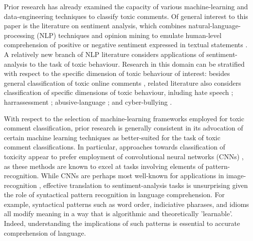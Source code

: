 
Prior research has already examined the capacity of various machine-learning and data-engineering techniques to classify toxic comments. 
Of general interest to this paper is the literature on sentiment analysis, which combines natural-language-processing (NLP) techniques and opinion mining to emulate human-level comprehension of positive or negative sentiment expressed in textual statements \cite{chowdhary2020natural, cambria2014jumping}.
A relatively new branch of NLP literature considers applications of sentiment-analysis to the task of toxic behaviour. 
Research in this domain can be stratified with respect to the specific dimension of toxic behaviour of interest: besides general classification of toxic online comments \cite{georgakopoulos2018convolutional,van2018challenges,risch2020toxic}, related literature also considers classification of specific dimensions of toxic behaviour, inluding hate speech \cite{mullah2021advances, ayo2020machine, rizos2019augment, yang2019exploring}; harrassessment \cite{abarna2022identification, basu2021cyberpolice, marwa2018deep}; abusive-language \cite{vidgen2020directions, nobata2016abusive, bourgonje2017automatic}; and cyber-bullying \cite{kanan2020cyber, akhter2019cyber, di2016unsupervised}.

With respect to the selection of machine-learning frameworks employed for toxic comment classification, prior research is generally consistent in its advocation of certain machine learning techniques as better-suited for the task of toxic comment classifications. In particular, approaches towards classification of toxicity appear to prefer employment of convolutional neural networks (CNNs) \cite{androcec2020machine}, as these methods are known to excel at tasks involving elements of pattern-recognition. While CNNs are perhaps most well-known for applications in image-recognition \cite{rawat2017deep}, effective translation to sentiment-analysis tasks is unsurprising given the role of syntactical pattern recognition in language comprehension. For example, syntactical patterns such as word order, indiciative pharases, and idioms all modify meaning in a way that is algorithmic and theoretically 'learnable'. Indeed, understanding the implications of such patterns is essential to accurate comprehension of language. 

